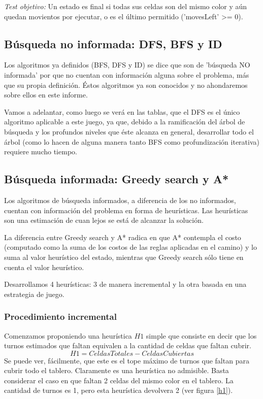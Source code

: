 \documentclass{article}
\begin{document}
\emph{Test objetivo:} Un estado es final si todas sus celdas son del mismo color y a\'un quedan movientos por ejecutar, o es el \'ultimo permitido ('movesLeft' >= 0).

\subsection{B\'usqueda no informada: DFS, BFS y ID}
Los algoritmos ya definidos (BFS, DFS y ID) se dice que son de 'b\'usqueda NO informada' por que no cuentan con informaci\'on alguna sobre el problema, m\'as que su propia definici\'on.
\'Estos algoritmos ya son conocidos y no ahondaremos sobre ellos en este informe.

Vamos a adelantar, como luego se ver\'a en las tablas, que el DFS es el \'unico algoritmo aplicable a este juego, ya que, debido a la ramificaci\'on del \'arbol de b\'usqueda y los profundos niveles que \'este alcanza en general, desarrollar todo el \'arbol (como lo hacen de alguna manera tanto BFS como profundizaci\'on iterativa) requiere mucho tiempo.

\subsection{B\'usqueda informada: Greedy search y A*}

Los algoritmos de b\'usqueda informados, a diferencia de los no informados, cuentan con informaci\'on del problema en forma de heur\'isticas. Las heur\'isticas son una estimaci\'on de cuan lejos se est\'a de alcanzar la soluci\'on.

La diferencia entre Greedy search y A* radica en que A* contempla el costo (computado como la suma de los costos de las reglas aplicadas en el camino) y lo suma al valor heur\'istico del estado, mientras que Greedy search s\'olo tiene en cuenta el valor heur\'istico.

Desarrollamos 4 heur\'isticas: 3 de manera incremental y la otra basada en una estrategia de juego.

\subsubsection{Procedimiento incremental}

Comenzamos proponiendo una heur\'istica $H1$ simple que consiste en decir que los turnos estimados que faltan equivalen a la cantidad de celdas que faltan cubrir.
\[
H1 = CeldasTotales - CeldasCubiertas
\]
Se puede ver, f\'acilmente, que este es el tope m\'aximo de turnos que faltan para cubrir todo el tablero. Claramente es una heur\'istica no admisible. Basta considerar el caso en que faltan 2 celdas del mismo color en el tablero. La cantidad de turnos es 1, pero esta heur\'istica devolvera 2 (ver figura \ref{h1}).
\end{document}
